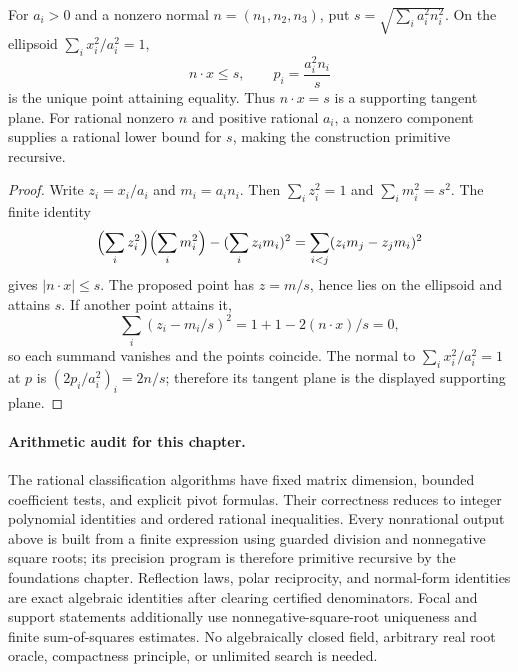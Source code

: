 \begin{theorem}
\label{con:ellipsoid-support}
For $a_i>0$ and a nonzero normal $n=(n_1,n_2,n_3)$, put
$s=\sqrt{\sum_i a_i^2n_i^2}$. On the ellipsoid
$\sum_i x_i^2/a_i^2=1$,
\[
 n\cdot x\le s,
 \qquad
 p_i=\frac{a_i^2n_i}{s}
\]
is the unique point attaining equality. Thus $n\cdot x=s$ is a
supporting tangent plane. For rational nonzero $n$ and positive
rational $a_i$, a nonzero component supplies a rational lower bound
for $s$, making the construction primitive recursive.
\end{theorem}
\begin{proof}
Write $z_i=x_i/a_i$ and $m_i=a_i n_i$. Then $\sum_i z_i^2=1$ and
$\sum_i m_i^2=s^2$. The finite identity
\[
 \Bigl(\sum_i z_i^2\Bigr)\Bigl(\sum_i m_i^2\Bigr)
 -(\sum_i z_i m_i)^2
 =\sum_{i<j}(z_i m_j-z_j m_i)^2
\]
gives $|n\cdot x|\le s$. The proposed point has $z=m/s$, hence
lies on the ellipsoid and attains $s$. If another point attains it,
\[
 \sum_i(z_i-m_i/s)^2=1+1-2(n\cdot x)/s=0,
\]
so each summand vanishes and the points coincide. The normal to
$\sum_i x_i^2/a_i^2=1$ at $p$ is $(2p_i/a_i^2)_i=2n/s$;
therefore its tangent plane is the displayed supporting plane.
\end{proof}

\paragraph{Arithmetic audit for this chapter.}
The rational classification algorithms have fixed matrix dimension,
bounded coefficient tests, and explicit pivot formulas. Their correctness
reduces to integer polynomial identities and ordered rational inequalities.
Every nonrational output above is built from a finite expression using
guarded division and nonnegative square roots; its precision program is
therefore primitive recursive by the foundations chapter. Reflection laws,
polar reciprocity, and normal-form identities are exact algebraic
identities after clearing certified denominators. Focal and support
statements additionally use nonnegative-square-root uniqueness and finite
sum-of-squares estimates. No algebraically closed field, arbitrary real
root oracle, compactness principle, or unlimited search is needed.
